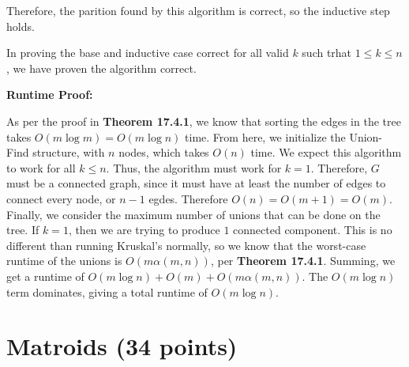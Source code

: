 \documentclass[11pt]{article}
\begin{document}
Therefore, the parition found by this algorithm is correct, so the inductive step holds.

In proving the base and inductive case correct for all valid $k$ such trhat $1 \leq k \leq n$, we have proven the algorithm correct.

\bigbreak

\textbf{Runtime Proof:}

As per the proof in \textbf{Theorem 17.4.1}, we know that sorting the edges in the tree takes $O(m \log m) = O(m \log n)$ time. 
From here, we initialize the Union-Find structure, with $n$ nodes, which takes $O(n)$ time. 
We expect this algorithm to work for all $k \leq n$. Thus, the algorithm must work for $k = 1$. Therefore, $G$ must be a connected graph, 
since it must have at least the number of edges to connect every node, or $n - 1$ egdes. Therefore $O(n) = O(m + 1) = O(m)$. 
Finally, we consider the maximum number of unions that can be done on the tree. If $k = 1$, then we are trying to produce $1$ connected component. 
This is no different than running Kruskal's normally, so we know that the worst-case runtime of the unions is $O(m\alpha(m, n))$, per \textbf{Theorem 17.4.1}. 
Summing, we get a runtime of $O(m \log n) + O(m) + O(m\alpha(m, n))$. The $O(m \log n)$ term dominates, giving a total runtime of $O(m \log n)$.

\section{Matroids (34 points)}
\end{document}
